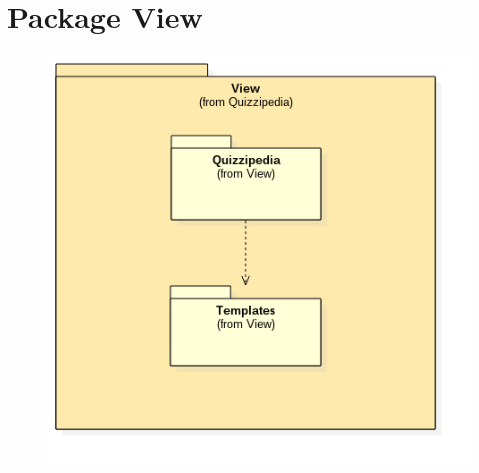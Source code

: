 \section{Package View}
\begin{figure}[h!]
\begin{center}
	\includegraphics[scale=0.7]{../images/ViewPackage.png}
\end{center}
\end{figure}

